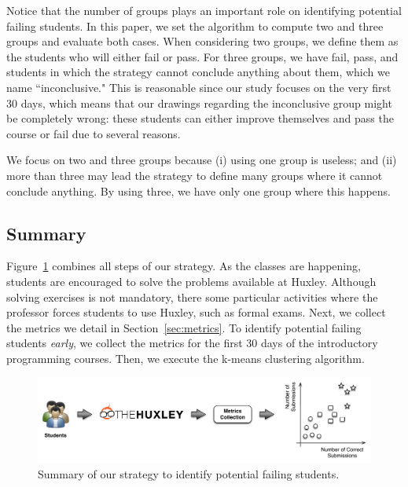 Notice that the number of groups plays an important role on identifying potential failing students. In this paper, we set the algorithm to compute two and three groups and evaluate both cases. When considering two groups, we define them as the students who will either fail or pass. For three groups, we have fail, pass, and students in which the strategy cannot conclude anything about them, which we name ``inconclusive." This is reasonable since our study focuses on the very first 30 days, which means that our drawings regarding the inconclusive group might be completely wrong: these students can either improve themselves and pass the course or fail due to several reasons.

We focus on two and three groups because (i) using one group is useless; and (ii) more than three may lead the strategy to define many groups where it cannot conclude anything. By using three, we have only one group where this happens. 

\subsection{Summary}

Figure~\ref{fig:strategy} combines all steps of our strategy. As the classes are happening, students are encouraged to solve the problems available at Huxley. Although solving exercises is not mandatory, there some particular activities where the professor forces students to use Huxley, such as formal exams. Next, we collect the metrics we detail in Section~\ref{sec:metrics}. To identify potential failing students \textit{early}, we collect the metrics for the first 30 days of the introductory programming courses. Then, we execute the k-means clustering algorithm.

\begin{figure}[htb]
\centering
\includegraphics[width=1.0\textwidth,natwidth=610,natheight=642]{images/Strategy.pdf}
\caption{Summary of our strategy to identify potential failing students.}
\label{fig:strategy}
\end{figure}